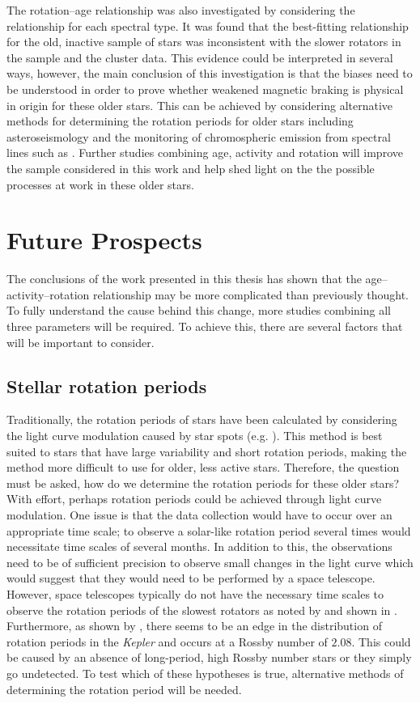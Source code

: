The rotation--age relationship was also investigated by considering the relationship for each spectral type. It was found that the best-fitting relationship for the old, inactive sample of stars was inconsistent with the slower rotators in the sample and the cluster data. This evidence could be interpreted in several ways, however, the main conclusion of this investigation is that the biases need to be understood in order to prove whether weakened magnetic braking is physical in origin for these older stars. This can be achieved by considering alternative methods for determining the rotation periods for older stars including  asteroseismology and the monitoring of chromospheric emission from spectral lines such as \caII. Further studies combining age, activity and rotation will improve the sample considered in this work and help shed light on the the possible processes at work in these older stars.

\section{Future Prospects}

The conclusions of the work presented in this thesis has shown that the age--activity--rotation relationship may be more complicated than previously thought. To fully understand the cause behind this change, more studies combining all three parameters will be required. To achieve this, there are several factors that will be important to consider.

\subsection{Stellar rotation periods}

Traditionally, the rotation periods of stars have been calculated by considering the light curve modulation caused by star spots (e.g. \citealt{McQuillan_etal_2014}). This method is best suited to stars that have large variability and short rotation periods, making the method more difficult to use for older, less active stars. Therefore, the question must be asked, how do we determine the rotation periods for these older stars? With effort, perhaps rotation periods could be achieved through light curve modulation. One issue is that the data collection would have to occur over an appropriate time scale; to observe a solar-like rotation period several times would necessitate time scales of several months. In addition to this, the observations need to be of sufficient precision to observe small changes in the light curve which would suggest that they would need to be performed by a space telescope. However, space telescopes typically do not have the necessary time scales to observe the rotation periods of the slowest rotators as noted by \citet{Barnes_etal_2016} and shown in \citet{Esselstein_etal_2018}. Furthermore, as shown by \citet{van_Saders_etal_2019}, there seems to be an edge in the distribution of rotation periods in the \textit{Kepler} and occurs at a Rossby number of $2.08$. This could be caused by an absence of long-period, high Rossby number stars or they simply go undetected. To test which of these hypotheses is true, alternative methods of determining the rotation period will be needed.


